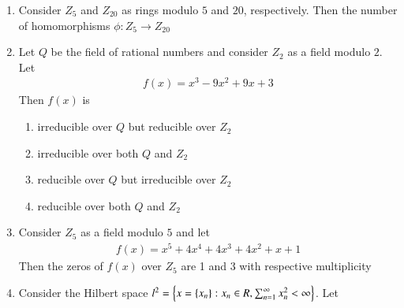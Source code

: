 \documentclass[journal]{IEEEtran}
\begin{document}
\begin{enumerate}
	\item Consider $Z_5$ and $Z_{20}$ as rings modulo $5$ and $20 $, respectively. Then the number of homomorphisms $\phi : Z_5 \rightarrow  Z_{20}$ 
		\begin{enumerate}
        	\end{enumerate}	
	\item Let $Q$ be the field of rational numbers and consider $Z_{2}$ as a field modulo $2$. Let
             \begin{align*}
		f(x)=x^{3}-9 x^{2}+9 x+3
             \end{align*}
		Then $f(x)$ is
		\begin{enumerate}
			\item irreducible over $Q$ but reducible over $Z_{2}$
            \item irreducible over both $Q$ and $Z_{2}$
            \item reducible over $Q$ but irreducible over $Z_{2}$
            \item reducible over both $Q$ and $Z_{2}$
        	\end{enumerate}	
	\item  Consider $Z_{5}$ as a field modulo $5$ and let
           \begin{align*}
		f(x)=x^{5}+4 x^{4}+4 x^{3}+4 x^{2}+x+1
             \end{align*}
             Then the zeros of $f(x)$ over $Z_{5}$ are 1 and 3 with respective multiplicity
		\begin{enumerate}
        	\end{enumerate}	
	\item Consider the Hilbert space $l^{2}=\left\{x=\left\{x_{n}\right\}: x_{n} \in R, \sum_{n=1}^{\infty} x_{n}^{2}<\infty\right\}$. Let
             \begin{align*}

\end{align*}
\end{enumerate}
\end{document}
